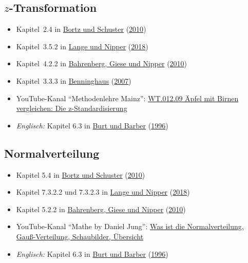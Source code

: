 \documentclass[
  11pt,
  ngerman,
  a4paper,
]{report}
\providecommand{\tightlist}{%
  \setlength{\itemsep}{0pt}\setlength{\parskip}{0pt}}
\begin{document}
\hypertarget{z-transformation-1}{%
\subsection{\texorpdfstring{\(z\)-Transformation}{z-Transformation}}\label{z-transformation-1}}

\begin{itemize}
\tightlist
\item
  Kapitel~2.4 in \protect\hyperlink{ref-bortz}{Bortz und Schuster} (\protect\hyperlink{ref-bortz}{2010})
\item
  Kapitel~3.5.2 in \protect\hyperlink{ref-delange}{Lange und Nipper} (\protect\hyperlink{ref-delange}{2018})
\item
  Kapitel~4.2.2 in \protect\hyperlink{ref-bahrenberg}{Bahrenberg, Giese und Nipper} (\protect\hyperlink{ref-bahrenberg}{2010})
\item
  Kapitel~3.3.3 in \protect\hyperlink{ref-benninghaus}{Benninghaus} (\protect\hyperlink{ref-benninghaus}{2007})
\item
  YouTube-Kanal \enquote{Methodenlehre Mainz}: \href{https://www.youtube.com/watch?v=AiucvUlIP8k}{WT.012.09 Äpfel mit Birnen vergleichen: Die z-Standardisierung}
\item
  \emph{Englisch:} Kapitel 6.3 in \protect\hyperlink{ref-burt}{Burt und Barber} (\protect\hyperlink{ref-burt}{1996})
\end{itemize}

\hypertarget{normalverteilung-1}{%
\subsection{Normalverteilung}\label{normalverteilung-1}}

\begin{itemize}
\tightlist
\item
  Kapitel 5.4 in \protect\hyperlink{ref-bortz}{Bortz und Schuster} (\protect\hyperlink{ref-bortz}{2010})
\item
  Kapitel 7.3.2.2 und 7.3.2.3 in \protect\hyperlink{ref-delange}{Lange und Nipper} (\protect\hyperlink{ref-delange}{2018})
\item
  Kapitel 5.2.2 in \protect\hyperlink{ref-bahrenberg}{Bahrenberg, Giese und Nipper} (\protect\hyperlink{ref-bahrenberg}{2010})
\item
  YouTube-Kanal \enquote{Mathe by Daniel Jung}: \href{https://www.youtube.com/watch?v=_f1vgWUiavY}{Was ist die Normalverteilung, Gauß-Verteilung, Schaubilder, Übersicht}
\item
  \emph{Englisch:} Kapitel 6.3 in \protect\hyperlink{ref-burt}{Burt und Barber} (\protect\hyperlink{ref-burt}{1996})
\end{itemize}
\end{document}

